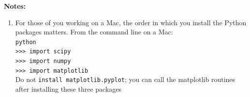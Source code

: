 \documentclass[12pt]{article}
\begin{document}
\noindent \textbf{Notes:}

\begin{enumerate}
\item For those of you working on a Mac, the order in which you install the Python packages matters. From the command line on a Mac:\\
    \texttt{python} \\
    \texttt{>>> import scipy} \\
    \texttt{>>> import numpy} \\
    \texttt{>>> import matplotlib} \\
    Do not \texttt{install matplotlib.pyplot}; you can call the matplotlib routines after installing these three packages
\end{enumerate}
\end{document}
